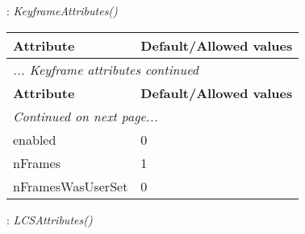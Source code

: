 \documentclass[10pt,a4paper]{report}
\begin{document}
\newpage

{}
: {\it KeyframeAttributes() }\\[-3mm]

\begin{longtable}{ll}
{\bf Attribute} & {\bf Default/Allowed values} \\
\hline \hline
\endfirsthead
\multicolumn{2}{l}{{\it ... Keyframe attributes continued}} \\
{\bf Attribute} & {\bf Default/Allowed values} \\
\hline \hline
\endhead
\hline
\multicolumn{2}{l}{{\it Continued on next page...}} \\
\endfoot
\hline
\endlastfoot

enabled  &  0 \\
nFrames  &  1 \\
nFramesWasUserSet  &  0 \\
\end{longtable}

\newpage

{}
: {\it LCSAttributes() }\\[-3mm]
\end{document}
